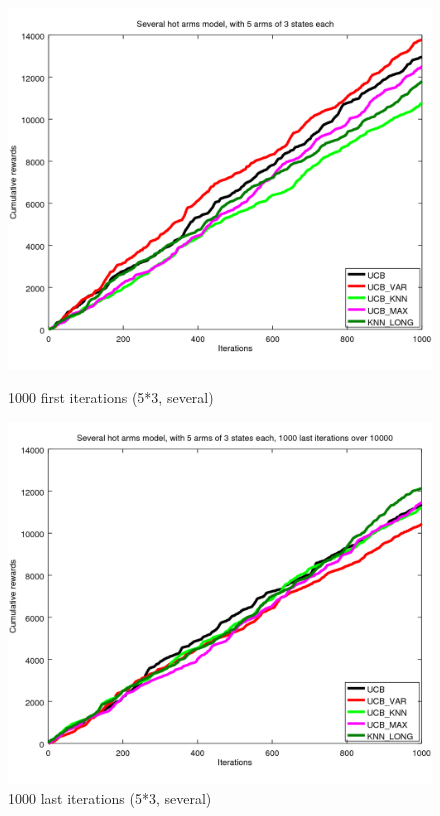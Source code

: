 \documentclass{article} %
\begin{document}
\begin{figure}[h]
	\begin{minipage}[b]{.49\linewidth}
		\includegraphics[width=1.0\textwidth]{begin_ms_1000it.png}
		\caption{1000 first iterations (5*3, several)}
	\end{minipage}
	\hfill
	\begin{minipage}[b]{0.49\linewidth}
		\includegraphics[width=1.0\textwidth]{last_ms_1000it.png}
		\caption{1000 last iterations (5*3, several)}
	\end{minipage}
	\label{fig:f}
\end{figure}
\end{document}
